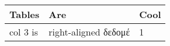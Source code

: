 \begin{longtable}[]{@{}lll@{}}
\hline
Tables & Are & Cool\tabularnewline
\hline
\endfirsthead
col 3 is & right-aligned δεδομέ & 1\tabularnewline
\hline
\end{longtable}
